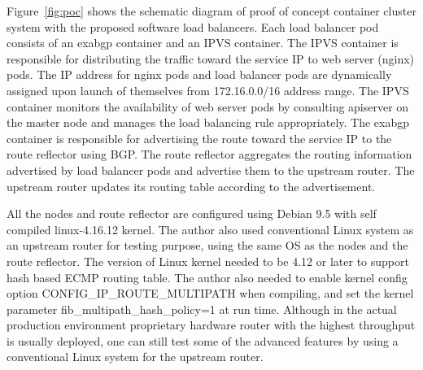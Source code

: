 Figure~\ref{fig:poc} shows the schematic diagram of proof of concept container cluster system with the proposed software load balancers.
%
Each load balancer pod consists of an exabgp \cite{exa-networks_2018} container and an IPVS container.
The IPVS container is responsible for distributing the traffic toward the service IP to web server (nginx) pods.
The IP address for nginx pods and load balancer pods are dynamically assigned upon launch of themselves from 172.16.0.0/16 address range.
The IPVS container monitors the availability of web server pods by consulting apiserver on the master node and manages the load balancing rule appropriately.
The exabgp container is responsible for advertising the route toward the service IP to the route reflector using BGP.
The route reflector aggregates the routing information advertised by load balancer pods and advertise them to the upstream router.
The upstream router updates its routing table according to the advertisement.

All the nodes and route reflector are configured using Debian 9.5 with self compiled linux-4.16.12 kernel.  
The author also used conventional Linux system as an upstream router for testing purpose, using the same OS as the nodes and the route reflector.
The version of Linux kernel needed to be 4.12 or later to support hash based ECMP routing table.
The author also needed to enable kernel config option CONFIG\_IP\_ROUTE\_MULTIPATH \cite{ipsysctl} when compiling, and set the kernel parameter fib\_multipath\_hash\_policy=1 at run time.
Although in the actual production environment proprietary hardware router with the highest throughput is usually deployed, one can still test some of the advanced features by using a conventional Linux system for the upstream router.

